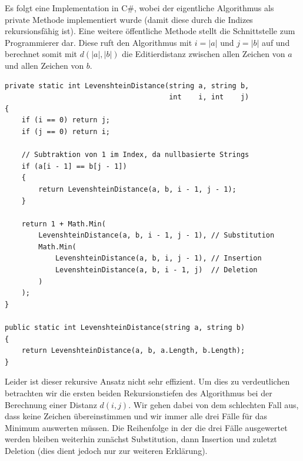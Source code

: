 \documentclass{whswinvcbook}
\begin{document}
Es folgt eine Implementation in C\#, wobei der eigentliche Algorithmus als private Methode implementiert wurde (damit diese durch die Indizes rekursionsfähig ist). Eine weitere öffentliche Methode stellt die Schnittstelle zum Programmierer dar. Diese ruft den Algorithmus mit $i=|a|$ und $j=|b|$ auf und berechnet somit mit $d(|a|,|b|)$ die Editierdistanz zwischen allen Zeichen von $a$ und allen Zeichen von $b$.
\begin{lstlisting}[caption=Rekursiver Algorithmus zur Berechnung der Levenshtein-Distanz, label=lst:levenshtein_recursive]
private static int LevenshteinDistance(string a, string b,
                                       int    i, int    j)
{
    if (i == 0) return j;
    if (j == 0) return i;

    // Subtraktion von 1 im Index, da nullbasierte Strings
    if (a[i - 1] == b[j - 1])
    {
        return LevenshteinDistance(a, b, i - 1, j - 1);
    }

    return 1 + Math.Min(
        LevenshteinDistance(a, b, i - 1, j - 1), // Substitution
        Math.Min(
            LevenshteinDistance(a, b, i, j - 1), // Insertion
            LevenshteinDistance(a, b, i - 1, j)  // Deletion
        )
    );
}

public static int LevenshteinDistance(string a, string b)
{
    return LevenshteinDistance(a, b, a.Length, b.Length);
}
\end{lstlisting}
Leider ist dieser rekursive Ansatz nicht sehr effizient. Um dies zu verdeutlichen betrachten wir die ersten beiden Rekursionstiefen des Algorithmus bei der Berechnung einer Distanz $d(i,j)$. Wir gehen dabei von dem schlechten Fall aus, dass keine Zeichen übereinstimmen und wir immer alle drei Fälle für das Minimum auswerten müssen. Die Reihenfolge in der die drei Fälle ausgewertet werden bleiben weiterhin zunächst Substitution, dann Insertion und zuletzt Deletion (dies dient jedoch nur zur weiteren Erklärung).
\end{document}
